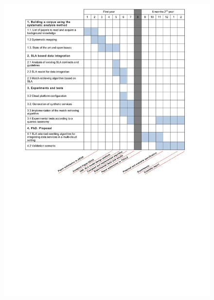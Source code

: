 \documentclass[11pt,a4paper,oneside]{report}
\begin{document}
\begin{figure}[!b]
\center
\includegraphics[scale=0.52]{calendario.pdf}
\end{figure}



\end{document}
